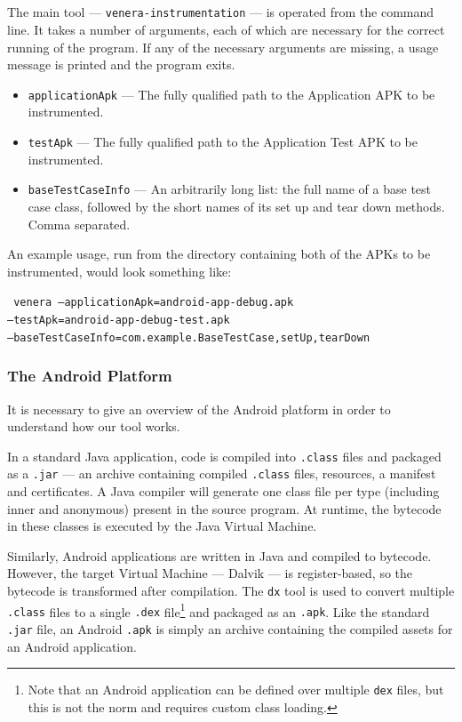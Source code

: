 \subsection{\venerainst{}}

The main tool --- {\tt venera-instrumentation} --- is operated from the
command line. It takes a number of arguments, each of which are necessary for
the correct running of the program. If any of the necessary arguments are
missing, a usage message is printed and the program exits.

\begin{itemize}
    \item {\tt applicationApk} --- The fully qualified path to the Application
    APK to be instrumented.
    \item {\tt testApk} --- The fully qualified path to the Application Test APK
    to be instrumented.
    \item {\tt baseTestCaseInfo} --- An arbitrarily long list: the full name of
    a base test case class, followed by the short names of its set up and tear
    down methods. Comma separated.
\end{itemize}

An example usage, run from the directory containing both of the APKs to be
instrumented, would look something like:

\texttt{
  venera --applicationApk=android-app-debug.apk\\
  --testApk=android-app-debug-test.apk\\
  --baseTestCaseInfo=com.example.BaseTestCase,setUp,tearDown
}

\subsubsection{The Android Platform}

It is necessary to give an overview of the Android platform in order to
understand how our \venerainst{} tool works.

In a standard Java application, code is compiled into {\tt .class} files and
packaged as a {\tt .jar} --- an archive containing compiled {\tt .class} files,
resources, a manifest and certificates. A Java compiler will generate one class
file per type (including inner and anonymous) present in the source program. At
runtime, the bytecode in these classes is executed by the Java Virtual Machine.

Similarly, Android applications are written in Java and compiled to bytecode.
However, the target Virtual Machine --- Dalvik --- is register-based, so the
bytecode is transformed after compilation. The {\tt dx} tool is used to convert
multiple {\tt .class} files to a single {\tt .dex} file\footnote{Note that an
Android application can be defined over multiple {\tt dex} files, but this is
not the norm and requires custom class loading.} and packaged as an {\tt .apk}.
Like the standard {\tt .jar} file, an Android {\tt .apk} is simply an archive
containing the compiled assets for an Android application.

